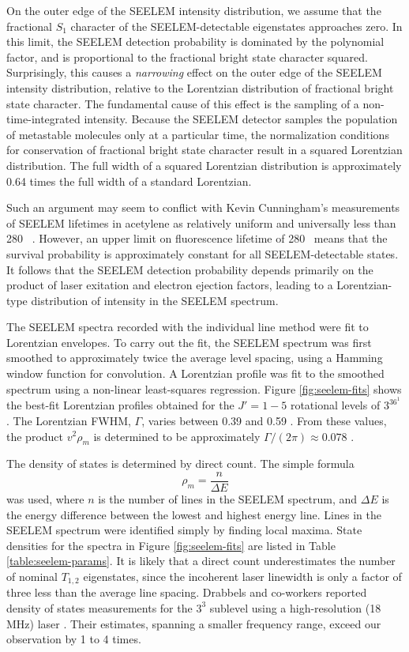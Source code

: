 On the outer edge of the SEELEM intensity distribution, we assume that
the fractional $S_1$ character of the SEELEM-detectable eigenstates
approaches zero.  In this limit, the SEELEM detection probability is
dominated by the polynomial factor, and is proportional to the
fractional bright state character squared.  Surprisingly, this causes
a \emph{narrowing} effect on the outer edge of the SEELEM intensity
distribution, relative to the Lorentzian distribution of fractional
bright state character.  The fundamental cause of this effect is the
sampling of a non-time-integrated intensity.  Because the SEELEM
detector samples the population of metastable molecules only at a
particular time, the normalization conditions for conservation of
fractional bright state character result in a squared Lorentzian
distribution.  The full width of a squared Lorentzian distribution is
approximately 0.64 times the full width of a standard Lorentzian.

Such an argument may seem to conflict with Kevin Cunningham's
measurements of SEELEM lifetimes in acetylene as relatively uniform
and universally less than 280 \microsec\ \cite{cunningham-thesis}.
However, an upper limit on fluorescence lifetime of 280 \microsec\
means that the survival probability is approximately constant for all
SEELEM-detectable states.  It follows that the SEELEM detection
probability depends primarily on the product of laser exitation and
electron ejection factors, leading to a Lorentzian-type distribution
of intensity in the SEELEM spectrum.

The SEELEM spectra recorded with the individual line method were fit to
Lorentzian envelopes.  To carry out the fit, the SEELEM spectrum was
first smoothed to approximately twice the average level spacing, using
a Hamming window function for convolution.  A Lorentzian profile was
fit to the smoothed spectrum using a non-linear least-squares
regression.  Figure \ref{fig:seelem-fits} shows the best-fit
Lorentzian profiles obtained for the $J'=1-5$ rotational levels of
$3^36^1$ \Ka{0}.  The Lorentzian FWHM, $\Gamma$, varies between 0.39 and
0.59 \rcm.  From these values, the product $v^2 \rho_m$ is determined
to be approximately $\Gamma / (2 \pi) \approx 0.078$ \rcm.  

The density of states is determined by direct count.  The simple
formula
\begin{equation}
\rho_m = \frac{n}{\Delta E}
\end{equation}
was used, where $n$ is the number of lines in the SEELEM spectrum, and
$\Delta E$ is the energy difference between the lowest and highest
energy line.  Lines in the SEELEM spectrum were identified simply by
finding local maxima.  State densities for the spectra in Figure
\ref{fig:seelem-fits} are listed in Table \ref{table:seelem-params}.
It is likely that a direct count underestimates the number of nominal
$T_{1,2}$ eigenstates, since the incoherent laser linewidth is only a
factor of three less than the average line spacing.  Drabbels and
co-workers reported density of states measurements for the $3^3$
\Ka{1} sublevel using a high-resolution (18 MHz) laser
\cite{drabbels94}.  Their estimates, spanning a smaller frequency
range, exceed our observation by 1 to 4 times.

